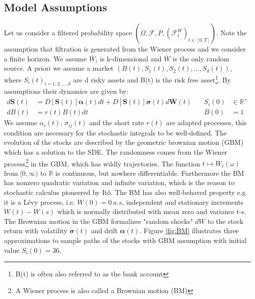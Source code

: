 \subsection{Model Assumptions}
Let us consider a filtered probability space $(\Omega, \mathcal{F}, P, (\mathcal{F}_t^{\bar{W}})_{t \in [0,T]})$. Note the assumption that filtration is generated from the Wiener process and we consider a finite horizon. We assume $\bar{W}_i$ is k-dimensional and $\bar{W}$ is the only random source. A priori we assume a market $(B(t),S_1(t), S_2(t),\ldots, S_d(t))$, where ${S_i(t)}_{i=1,2,\ldots,d}$ are d risky assets and B(t) is the risk free asset\footnote{B(t) is often also referred to as the bank account}. By assumptions their dynamics are given by:\\
\begin{align}
d\bm{S}(t)&=D[\bm{S}(t)]\bm{\alpha}(t)dt+D[\bm{S}(t)]\bm{\sigma}(t)d\bar{\bm{W}}(t) \quad & S_i(0) &\in \mathbb{R}^+ \label{GBM-P} \\
dB(t)&=r(t)B(t)dt \quad & B(0) &= 1
\end{align}
We assume $\alpha_i(t)$, $\sigma_{ij}(t)$ and the short rate $r(t)$ are adapted processes, this condition are necessary for the stochastic integrals to be well-defined. The evolution of the stocks are described by the geometric brownian motion (GBM) which has a solution to the SDE. The randomness comes from the Wiener process\footnote{A Wiener process is also called a Brownian motion (BM)} in the GBM, which has wildly trajectories. The function $t\mapsto W_{t}(\omega)$ from $[0,\infty)$ to $\mathbb{R}$ is continuous, but nowhere differentiable. Furthermore the BM has nonzero quadratic variation and infinite variation, which is the reason to stochastic calculus pioneered by Itô. The BM has also well-behaved property e.g. it is a Lévy process, i.e. $W(0)=0 \ a.s$, independent and stationary increments $W(t)-W(s)$ which is normally distributed with mean zero and variance t-s. The Brownian motion in the GBM formalizes "random shocks" $dW$ to the stock return with volatility $\bm{\sigma}(t)$ and drift $\bm{\alpha}(t)$. Figure \ref{fig:BM} illustrates three approximations to sample paths of the stocks with GBM assumption with initial value $S_{i}(0)=36$.\\


